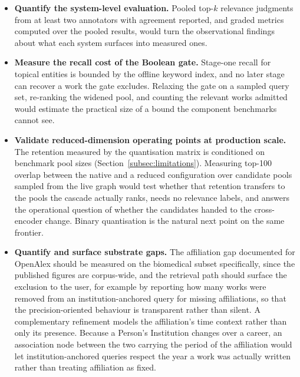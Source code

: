 \begin{itemize}
  \item \textbf{Quantify the system-level evaluation.} Pooled top-$k$ relevance judgments from at least two annotators with agreement reported, and graded metrics computed over the pooled results, would turn the observational findings about what each system surfaces into measured ones.

  \item \textbf{Measure the recall cost of the Boolean gate.} Stage-one recall for topical entities is bounded by the offline keyword index, and no later stage can recover a work the gate excludes. Relaxing the gate on a sampled query set, re-ranking the widened pool, and counting the relevant works admitted would estimate the practical size of a bound the component benchmarks cannot see.

  \item \textbf{Validate reduced-dimension operating points at production scale.} The retention measured by the quantisation matrix is conditioned on benchmark pool sizes (Section~\ref{subsec:limitations}). Measuring top-100 overlap between the native and a reduced configuration over candidate pools sampled from the live graph would test whether that retention transfers to the pools the cascade actually ranks, needs no relevance labels, and answers the operational question of whether the candidates handed to the cross-encoder change. Binary quantisation is the natural next point on the same frontier.

  \item \textbf{Quantify and surface substrate gaps.} The affiliation gap documented for OpenAlex should be measured on the biomedical subset specifically, since the published figures are corpus-wide, and the retrieval path should surface the exclusion to the user, for example by reporting how many works were removed from an institution-anchored query for missing affiliations, so that the precision-oriented behaviour is transparent rather than silent. A complementary refinement models the affiliation's time context rather than only its presence. Because a Person's Institution changes over a career, an association node between the two carrying the period of the affiliation would let institution-anchored queries respect the year a work was actually written rather than treating affiliation as fixed.


\end{itemize}
